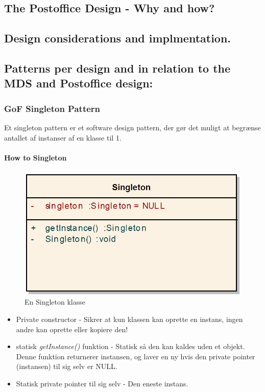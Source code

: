 \subsection{The Postoffice Design - Why and how?}

\subsection{Design considerations and implmentation.}

\subsection{Patterns per design and in relation to the MDS and Postoffice design:}

\subsubsection{GoF Singleton Pattern}

Et singleton pattern er et software design pattern, der gør det muligt at begrænse antallet af instanser af en klasse til 1.

\paragraph{How to Singleton}

\begin{figure}[h]
	\centering
	\includegraphics[width=0.6\linewidth]{figs/spm5/SingletonClass}
	\caption{En Singleton klasse}
	\label{fig:SingletonClass}
\end{figure}

\begin{itemize}
	\item Private constructor - Sikrer at kun klassen kan oprette en instans, ingen andre kan oprette eller kopiere den!
	\item statisk \textit{getInstance()} funktion - Statisk så den kan kaldes uden et objekt. Denne funktion returnerer instansen, og laver en ny hvis den private pointer (instansen) til sig selv er NULL.
	\item Statisk private pointer til sig selv - Den eneste instans.
\end{itemize}


